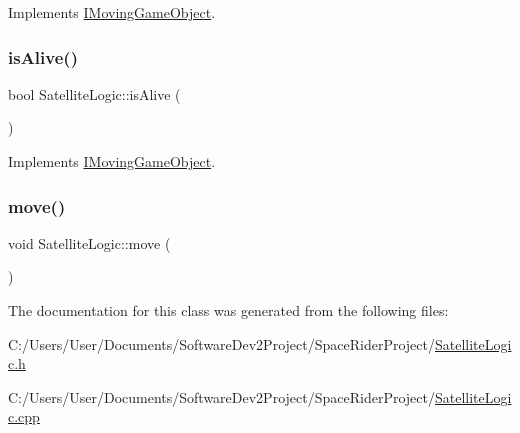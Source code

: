 Implements \hyperlink{class_i_moving_game_object_a153c0017219e17262a9cceddba3f61d6}{I\+Moving\+Game\+Object}.

\mbox{\label{class_satellite_logic_aa8f39f77a7783f8a97698ea750b34e94}} 
\subsubsection{\texorpdfstring{is\+Alive()}{isAlive()}}
{\footnotesize\ttfamily bool Satellite\+Logic\+::is\+Alive (\begin{DoxyParamCaption}{ }\end{DoxyParamCaption})\hspace{0.3cm}{\ttfamily [virtual]}}



Implements \hyperlink{class_i_moving_game_object_ab88f75c872699dd1376e5e83f6188e34}{I\+Moving\+Game\+Object}.

\mbox{\label{class_satellite_logic_a1ad746e5a17b9ac2bea379fca9a74147}} 
\subsubsection{\texorpdfstring{move()}{move()}}
{\footnotesize\ttfamily void Satellite\+Logic\+::move (\begin{DoxyParamCaption}{ }\end{DoxyParamCaption})}



The documentation for this class was generated from the following files\+:\begin{DoxyCompactItemize}
\item 
C\+:/\+Users/\+User/\+Documents/\+Software\+Dev2\+Project/\+Space\+Rider\+Project/\hyperlink{_satellite_logic_8h}{Satellite\+Logic.\+h}\item 
C\+:/\+Users/\+User/\+Documents/\+Software\+Dev2\+Project/\+Space\+Rider\+Project/\hyperlink{_satellite_logic_8cpp}{Satellite\+Logic.\+cpp}\end{DoxyCompactItemize}
